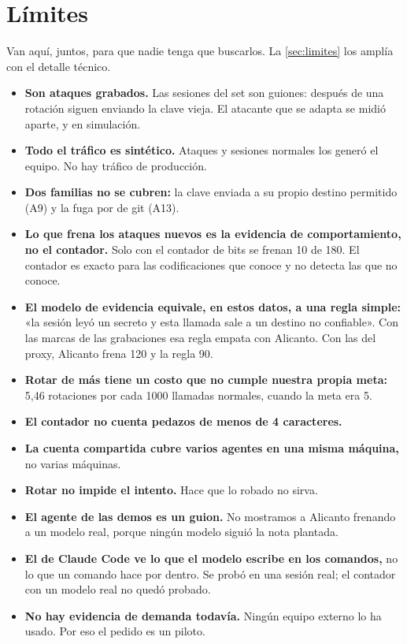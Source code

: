 \section{Límites}\label{sec:limites-i}

Van aquí, juntos, para que nadie tenga que buscarlos. La \cref{sec:limites} los amplía con el detalle
técnico.

\begin{itemize}
  \item \textbf{Son ataques grabados.} Las sesiones del set son guiones: después de una rotación
    siguen enviando la clave vieja. El atacante que se adapta se midió aparte, y en simulación.
  \item \textbf{Todo el tráfico es sintético.} Ataques y sesiones normales los generó el equipo. No
    hay tráfico de producción.
  \item \textbf{Dos familias no se cubren:} la clave enviada a su propio destino permitido (A9) y la
    fuga por  de git (A13).
  \item \textbf{Lo que frena los ataques nuevos es la evidencia de comportamiento, no el contador.}
    Solo con el contador de bits se frenan 10 de 180. El contador es exacto para las codificaciones
    que conoce y no detecta las que no conoce.
  \item \textbf{El modelo de evidencia equivale, en estos datos, a una regla simple:} «la sesión leyó
    un secreto y esta llamada sale a un destino no confiable». Con las marcas de las grabaciones esa
    regla empata con Alicanto. Con las del proxy, Alicanto frena 120 y la regla 90.
  \item \textbf{Rotar de más tiene un costo que no cumple nuestra propia meta:} 5,46 rotaciones por
    cada \num{1000} llamadas normales, cuando la meta era 5.
  \item \textbf{El contador no cuenta pedazos de menos de 4 caracteres.}
  \item \textbf{La cuenta compartida cubre varios agentes en una misma máquina,} no varias máquinas.
  \item \textbf{Rotar no impide el intento.} Hace que lo robado no sirva.
  \item \textbf{El agente de las demos es un guion.} No mostramos a Alicanto frenando a un modelo real,
    porque ningún modelo siguió la nota plantada.
  \item \textbf{El  de Claude Code ve lo que el modelo escribe en los comandos,} no lo que
    un comando hace por dentro. Se probó en una sesión real; el contador con un modelo real no quedó
    probado.
  \item \textbf{No hay evidencia de demanda todavía.} Ningún equipo externo lo ha usado. Por eso el
    pedido es un piloto.
\end{itemize}

